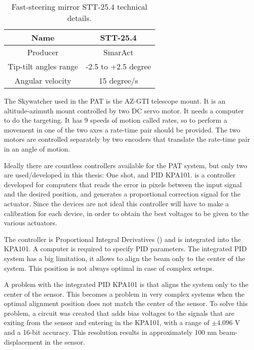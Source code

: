 \begin{table}[h!]
      \centering
      \begin{tabular}{ |c|c| }
            \hline
            Name                  & STT-25.4            \\\hline
            Producer              & SmarAct             \\\hline
            Tip-tilt angles range & -2.5 to +2.5 degree \\\hline
            Angular velocity      & 15 degree/s         \\\hline
      \end{tabular}
      \caption{Fast-steering mirror STT-25.4 technical details.}
      \label{table:3}
\end{table}

The Skywatcher used in the PAT is the AZ-GTI telescope mount. It is an altitude-azimuth mount controlled by two DC servo motor. It needs a computer to do the targeting.
It has 9 speeds of motion called rates, so to perform a movement in one of the two axes a rate-time pair should be provided. The two motors are controlled separately by two encoders that translate the rate-time pair in an angle of motion.

Ideally there are countless controllers available for the PAT system, but only two are used/developed in this thesis: One shot, and PID KPA101.
 is a controller developed for computers that reads the error in pixels between the input signal and the desired position, and generates a proportional correction signal for the actuator.
Since the devices are not ideal this controller will have to make a calibration for each device, in order to obtain the best voltages to be given to the various actuators.

The  controller is Proportional Integral Derivatives () and is integrated into the KPA101. A computer is required to specify PID parameters. The integrated PID system has a big limitation, it allows to align the beam only to the center of the system. This position is not always optimal in case of complex setups.

A problem with the integrated PID KPA101 is that aligns the system only to the center of the sensor. This becomes a problem in very complex systems when the optimal alignment position does not match the center of the sensor.
To solve this problem, a circuit was created that adds bias voltages to the signals that are exiting from the sensor and entering in the KPA101, with a range of $\pm 4.096$ V and a 16-bit accuracy. This resolution results in approximately 100 nm beam-displacement in the sensor.

